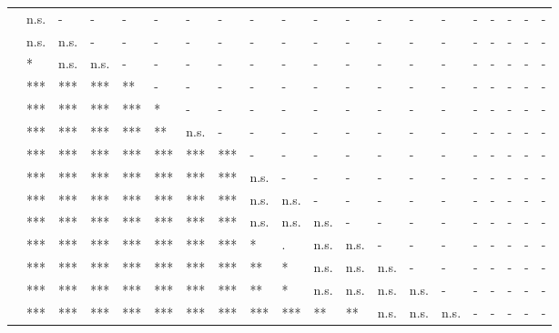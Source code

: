 \documentclass[11pt,fleqn]{article}
\newcommand{\6}{\mbox{$[\hspace*{-.6mm}[$}}
\newcommand{\9}{\mbox{$]\hspace*{-.6mm}]$}}
\begin{document}
\begin{landscape}
\begin{table}[h!]
\begin{tabular}{l l l l l l l l l l l l l l l l l l l l }
\midrule
\color{blue}{\em be right}\color{black}		& n.s. & - & - & - & - & - & - & - & - & - & - & - & - & - & - & - & - & - & - \\
\color{brown}{\em suggest}\color{black}			& n.s. & n.s. & - & - & - & - & - & - & - & - & - & - & - & - & - & - & - & - & - \\
\color{brown}{\em say}	\color{black}		& * & n.s. & n.s. & - & - & - & - & - & - & - & - & - & - & - & - & - & - & - & - \\
\color{black}{\em prove}\color{black}		& *** & *** & *** & ** & - & - & - & - & - & - & - & - & - & - & - & - & - & - & - \\
\color{brown}{\em think}\color{black}		& *** & *** & *** & *** & * & - & - & - & - & - & - & - & - & - & - & - & - & - & - \\
\color{black}{\em confirm}\color{black}		& *** & *** & *** & *** & ** & n.s. & - & - & - & - & - & - & - & - & - & - & - & - & - \\
\color{blue}{\em establish}\color{black}		& *** & *** & *** & *** & *** & *** & *** & - & - & - & - & - & - & - & - & - & - & - & - \\
\color{black}{\em demonstrate}\color{black}		& *** & *** & *** & *** & *** & *** & *** & n.s. & - & - & - & - & - & - & - & - & - & - & - \\
\color{black}{\em announce}\color{black}		& *** & *** & *** & *** & *** & *** & *** & n.s. & n.s. & - & - & - & - & - & - & - & - & - & - \\
\color{black}{\em confess}\color{black}	& *** & *** & *** & *** & *** & *** & *** & n.s. & n.s. & n.s. & - & - & - & - & - & - & - & - & - \\
\color{blue}{\em reveal}\color{black}			& *** & *** & *** & *** & *** & *** & *** & * & . & n.s. & n.s. & - & - & - & - & - & - & - & - \\
\color{black}{\em admit}\color{black}		& *** & *** & *** & *** & *** & *** & *** & ** & * & n.s. & n.s. &  n.s. & - & - & - & - & - & - & - \\
\color{black}{\em acknowledge}\color{black}	& *** & *** & *** & *** & *** & *** & *** & ** & * & n.s. & n.s. & n.s. & n.s. & - & - & - & - & - & - \\
\color{blue}{\em discover}\color{black}		& *** & *** & *** & *** & *** & *** & *** & *** & *** & ** & ** & n.s. & n.s. & n.s. & - & - & - & - & - \\

\end{tabular}
\end{table}
\end{landscape}
\end{document}
